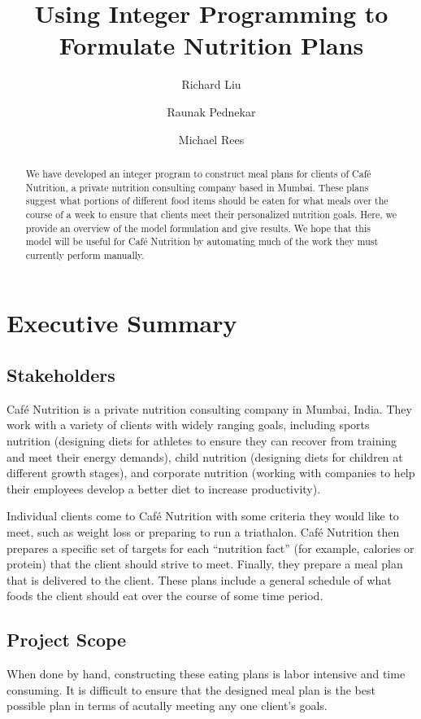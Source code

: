 \documentclass[twoside]{article}
\title{Using Integer Programming to Formulate Nutrition Plans}
\author{Richard Liu \and Raunak Pednekar \and Michael Rees}
\date{\parbox{\linewidth}{\centering 2 December 2016\endgraf\bigskip\bigskip\bigskip\it\small This document submitted in partial fulfillment of the requirements for passing MATH187:~Introduction~to~Operations~Research.}}
\newcommand{\cn}{Caf\'e Nutrition\xspace}
\begin{document}
\maketitle
\thispagestyle{empty}
\newpage\phantom{bla}
\newpage\phantom{bla}
\begin{abstract}
    We have developed an integer program to construct meal plans for clients of \cn, a private nutrition consulting company based in Mumbai. These plans suggest what portions of different food items should be eaten for what meals over the course of a week to ensure that clients meet their personalized nutrition goals. Here, we provide an overview of the model formulation and give results. We hope that this model will be useful for \cn by automating much of the work they must currently perform manually.
\end{abstract}
\newpage\phantom{bla}
\newpage\phantom{bla}
\pagestyle{main}
\section{Executive Summary}
\label{sec:summary}
\subsection{Stakeholders}
\cn is a private nutrition consulting company in Mumbai, India. They work with a variety of clients with widely ranging goals, including sports nutrition (designing diets for athletes to ensure they can recover from training and meet their energy demands), child nutrition (designing diets for children at different growth stages), and corporate nutrition (working with companies to help their employees develop a better diet to increase productivity).

Individual clients come to \cn with some criteria they would like to meet, such as weight loss or preparing to run a triathalon. \cn then prepares a specific set of targets for each ``nutrition fact'' (for example, calories or protein) that the client should strive to meet. Finally, they prepare a meal plan that is delivered to the client. These plans include a general schedule of what foods the client should eat over the course of some time period.
\subsection{Project Scope}
When done by hand, constructing these eating plans is labor intensive and time consuming. It is difficult to ensure that the designed meal plan is the best possible plan in terms of acutally meeting any one client's goals.
\end{document}
